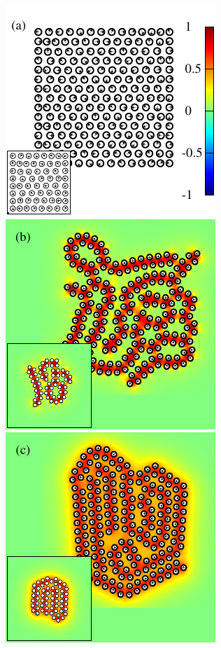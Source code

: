 \documentclass[prb,preprint,showpacs,preprintnumbers,amsmath,amssymb,longbibliography]{revtex4-1}
\begin{document}
\begin{figure}[h!]
\begin{center}
  \includegraphics[height=0.3\textheight]{Nb198a_inset.pdf}
  \includegraphics[height=0.3\textheight]{Nb198b_eta_inset.pdf}\\
  \includegraphics[height=0.3\textheight]{Nb198c_eta_inset.pdf}

\end{center}
\end{figure}
\end{document}
